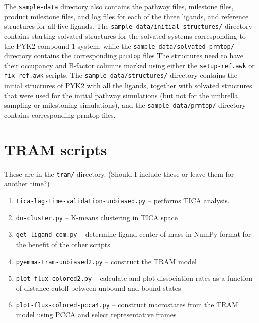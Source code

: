 \documentclass{article}      %
\begin{document}
The \verb+sample-data+ directory also contains the pathway files, milestone files, product milestone files, and log files for each of the three ligands, and reference structures for all five ligands.  The \verb+sample-data/initial-structures/+ directory contains starting solvated structures for the solvated systems corresponding to the PYK2-compound 1 system, while the \verb+sample-data/solvated-prmtop/+ directory contains the corresponding \verb+prmtop+ files  The structures need to have their occupancy and B-factor columns marked using either the \verb+setup-ref.awk+ or \verb+fix-ref.awk+ scripts.  The \verb+sample-data/structures/+ directory contains the initial structures of PYK2 with all the ligands, together with solvated structures that were used for the initial pathway simulations (but not for the umbrella sampling or milestoning simulations), and the \verb+sample-data/prmtop/+ directory contains corresponding prmtop files.  


\section{TRAM scripts}

These are in the \verb+tram/+ directory.   (Should I include these or leave them for another time?)
\begin{enumerate} 
\item \verb+tica-lag-time-validation-unbiased.py+ -- performs TICA analysis. \\
\item \verb+do-cluster.py+ -- K-means clustering in TICA space \\
\item \verb+get-ligand-com.py+ -- determine ligand center of mass in NumPy format for the benefit of the other scripts \\
\item \verb+pyemma-tram-unbiased2.py+ -- construct the TRAM model \\
\item \verb+plot-flux-colored2.py+ -- calculate  and plot dissociation rates as a function of distance cutoff between unbound and bound states \\
\item \verb+plot-flux-colored-pcca4.py+ -- construct macrostates from the TRAM model using PCCA and select representative frames
\end{enumerate}
\end{document}
